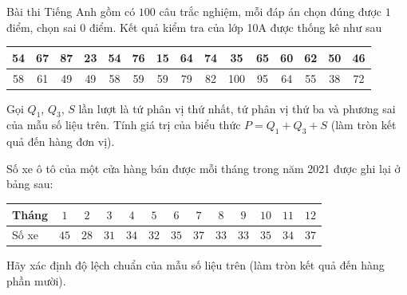 \begin{bt}%
	Bài thi Tiếng Anh gồm có $100$ câu trắc nghiệm, mỗi đáp án chọn đúng được $1$ điểm,  chọn sai $0$ điểm. Kết quả kiểm tra của lớp 10A được thống kê như sau
	\begin{longtable}{|c|c|c|c|c|c|c|c|c|c|c|c|c|c|c|}
		\hline 
		 54&67&87&23&54&76&15&64&74&35&65&60&62&50&46\\
		 \hline
		 58&61&49&49&58&59&59&79&82&100&95&64&55&38&72\\
		\hline 
	\end{longtable}\noindent
	Gọi $Q_1$, $Q_3$, $S$ lần lượt là tứ phân vị thứ  nhất, tứ phân vị thứ ba và phương sai của mẫu số liệu trên. Tính giá trị của biểu thức $P=Q_1+Q_3+S$ (làm tròn kết quả đến hàng đơn vị).
\end{bt}

\begin{bt}%
	Số xe ô tô của một cửa hàng bán được mỗi tháng trong năm 2021 được ghi lại ở bảng sau:
	\begin{center}
		\begin{tabular}{|l|c|c|c|c|c|c|c|c|c|c|c|c|}
			\hline
			Tháng & $1$ & $2$ & $3$ & $4$ & $5$ & $6$ & $7$ & $8$ & $9$ & $10$ & $11$ & $12$ \\
			\hline
			Số xe & $45$ & $28$ & $31$ & $34$ & $32$ & $35$ & $37$ & $33$ & $33$ & $35$ & $34$ & $37$ \\
			\hline
		\end{tabular}
	\end{center}
	Hãy xác định độ lệch chuẩn của mẫu số liệu trên (làm tròn kết quả đến hàng phần mười).
\end{bt}

